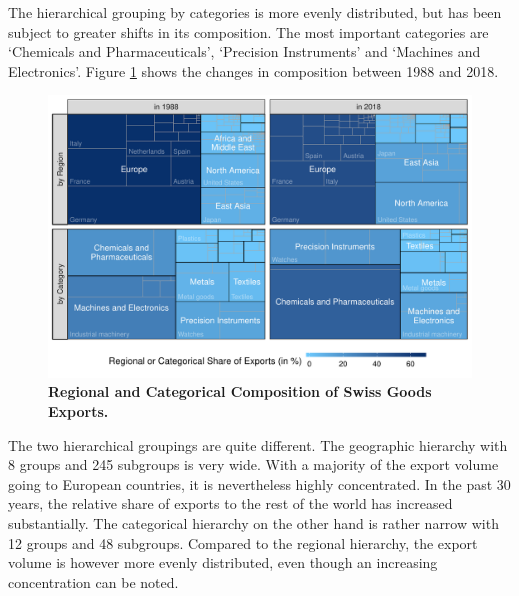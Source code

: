 \documentclass[a4paper,fleqn,11pt]{article}
\begin{document}
The hierarchical grouping by categories is more evenly distributed, but has been subject to greater shifts in its composition. The most important categories are `Chemicals and Pharmaceuticals', `Precision Instruments' and `Machines and Electronics'. Figure \ref{fig:treemap} shows the changes in composition between 1988 and 2018.
\begin{figure}[H]
	\includegraphics[width=\textwidth]{fig/fig_treemap}
	\caption[Regional and Categorical Composition of Swiss Goods Exports]{\textbf{Regional and Categorical Composition of Swiss Goods Exports.}}\label{fig:treemap}
\end{figure}
The two hierarchical groupings are quite different. The geographic hierarchy with 8 groups and 245 subgroups is very wide.  With a majority of the export volume going to European countries, it is nevertheless highly concentrated. In the past 30 years, the relative share of exports to the rest of the world has increased substantially. The categorical hierarchy on the other hand is rather narrow with 12 groups and 48 subgroups. Compared to the regional hierarchy, the export volume is however more evenly distributed, even though an increasing concentration can be noted.\\
\end{document}
